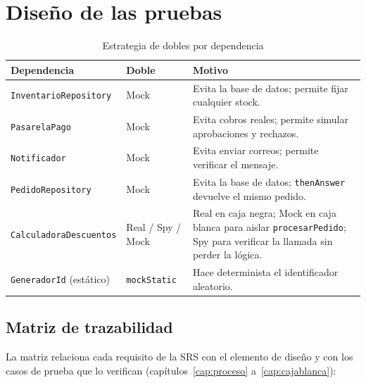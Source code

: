 \documentclass[11pt,a4paper,oneside]{report}
\newcommand{\code}[1]{\texttt{#1}}
\begin{document}
\section{Diseño de las pruebas}
\begin{table}[H]
\centering
\caption{Estrategia de dobles por dependencia}
\begin{tabularx}{\linewidth}{llX}
\toprule
\textbf{Dependencia} & \textbf{Doble} & \textbf{Motivo}\\
\midrule
\code{InventarioRepository} & Mock & Evita la base de datos; permite fijar cualquier stock.\\
\code{PasarelaPago} & Mock & Evita cobros reales; permite simular aprobaciones y rechazos.\\
\code{Notificador} & Mock & Evita enviar correos; permite verificar el mensaje.\\
\code{PedidoRepository} & Mock & Evita la base de datos; \code{thenAnswer} devuelve el mismo pedido.\\
\code{CalculadoraDescuentos} & Real / Spy / Mock & Real en caja negra; Mock en caja blanca para aislar \code{procesarPedido}; Spy para verificar la llamada sin perder la lógica.\\
\code{GeneradorId} (estático) & \code{mockStatic} & Hace determinista el identificador aleatorio.\\
\bottomrule
\end{tabularx}
\end{table}

\subsection{Matriz de trazabilidad}
La matriz relaciona cada requisito de la SRS con el elemento de diseño y con los casos de prueba que lo verifican (capítulos~\ref{cap:proceso} a~\ref{cap:cajablanca}):
\end{document}
